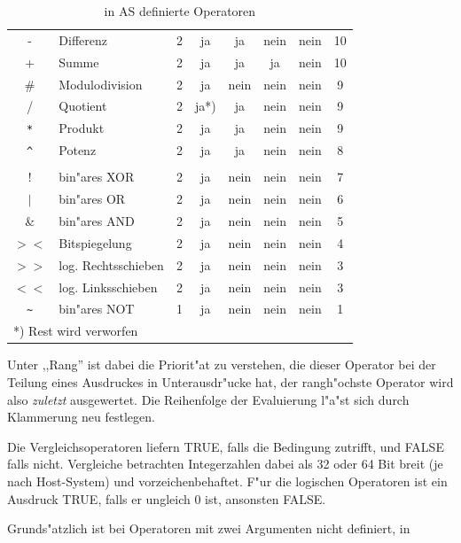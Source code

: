 \documentclass[12pt,a4paper,twoside]{report}
\newcommand{\ii}[1]{{\it #1}}
\newcommand{\asname}{AS}
\begin{document}
\begin{table}[htbp]
\begin{center}
\begin{tabular}{|c|l|c|c|c|c|c|c|}
-           & Differenz            & 2 & ja   & ja   & nein & nein & 10 \\
+           & Summe                & 2 & ja   & ja   & ja   & nein & 10 \\
\#          & Modulodivision       & 2 & ja   & nein & nein & nein & 9 \\
/           & Quotient             & 2 & ja*) & ja   & nein & nein & 9 \\
\verb! * !  & Produkt              & 2 & ja   & ja   & nein & nein & 9 \\
\verb! ^ !  & Potenz               & 2 & ja   & ja   & nein & nein & 8 \\
            & & & & & &  \\
$!$         & bin"ares XOR         & 2 & ja   & nein & nein & nein & 7 \\
$|$         & bin"ares OR          & 2 & ja   & nein & nein & nein & 6 \\
\&          & bin"ares AND         & 2 & ja   & nein & nein & nein & 5 \\
$><$        & Bitspiegelung        & 2 & ja   & nein & nein & nein & 4 \\
$>>$        & log. Rechtsschieben  & 2 & ja   & nein & nein & nein & 3 \\
$<<$        & log. Linksschieben   & 2 & ja   & nein & nein & nein & 3 \\
\verb! ~ !  & bin"ares NOT         & 1 & ja   & nein & nein & nein & 1 \\
\hline
\multicolumn{8}{|l|}{*) Rest wird verworfen} \\
\hline
\end{tabular}\end{center}
\caption{in \asname{} definierte Operatoren\label{TabOps}}
\end{table}
Unter ,,Rang'' ist dabei die Priorit"at zu verstehen, die dieser Operator bei
der Teilung eines Ausdruckes in Unterausdr"ucke hat, der rangh"ochste
Operator wird also \ii{zuletzt} ausgewertet.  Die Reihenfolge der
Evaluierung l"a"st sich durch Klammerung neu festlegen.
\par
Die Vergleichsoperatoren liefern TRUE, falls die Bedingung zutrifft,
und FALSE falls nicht.  Vergleiche betrachten Integerzahlen dabei als
32 oder 64 Bit breit (je nach Host-System) und vorzeichenbehaftet. F"ur
die logischen Operatoren ist ein Ausdruck TRUE, falls er ungleich 0 ist,
ansonsten FALSE.
\par
Grunds"atzlich ist bei Operatoren mit zwei Argumenten nicht definiert, in
\end{document}
